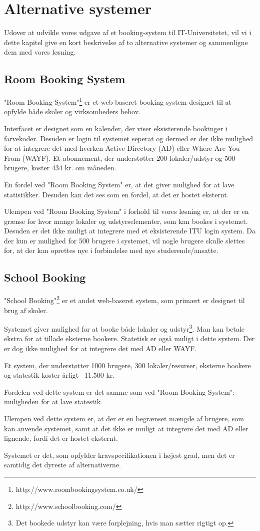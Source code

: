 \chapter{Alternative systemer}
\label{Comparison}
Udover at udvikle vores udgave af et booking-system til IT-Universitetet, vil vi i dette kapitel give en kort beskrivelse af to alternative  systemer og sammenligne dem med vores løsning.

\section{Room Booking System}
\label{Comparison_RBS}
"Room Booking System"\footnote{http://www.roombookingsystem.co.uk/} er et web-baseret booking system designet til at opfylde både skoler og virksomheders behov. 

Interfacet er designet som en kalender, der viser eksisterende bookinger i farvekoder. Desuden er login til systemet seperat og dermed er der ikke mulighed for at integrere det med hverken Active Directory (AD) eller Where Are You From (WAYF). Et abonnement, der understøtter 200 lokaler/udstyr og 500 brugere, koster 434 kr. om måneden.

En fordel ved "Room Booking System" er, at det giver mulighed for at lave statistikker. Desuden kan det ses som en fordel, at det er hostet eksternt.

Ulempen ved "Room Booking System" i forhold til vores løsning er, at der er en grænse for hvor mange lokaler og udstyrselementer, som kan bookes i systemet. Desuden er det ikke muligt at integrere med et eksisterende ITU login system. Da der kun er mulighed for 500 brugere i systemet, vil nogle brugere skulle slettes for, at der kan oprettes nye i forbindelse med nye studerende/ansatte.

\section{School Booking}
\label{Comparison_SB}
"School Booking"\footnote{http://www.schoolbooking.com/} er et andet web-baseret system, som primært er designet til brug af skoler. 

Systemet giver mulighed for at booke både lokaler og udstyr\footnote{Det bookede udstyr kan være forplejning, hvis man sætter rigtigt op.}. Man kan betale ekstra for at tillade eksterne bookere. Statetisk er også muligt i dette system. Der er dog ikke mulighed for at integrere det med AD eller WAYF.

Et system, der understøtter 1000 brugere, 300 lokaler/resurser, eksterne bookere og statestik koster årligt ~11.500 kr.

Fordelen ved dette system er det samme som ved "Room Booking System": muligheden for at lave statestik.

Ulempen ved dette system er, at der er en begrænset mængde af brugere, som kan anvende systemet, samt at det ikke er muligt at integrere det med AD eller lignende, fordi det er hostet eksternt.

Systemet er det, som opfylder kravspecifikationen i højest grad, men det er samtidig det dyreste af alternativerne.